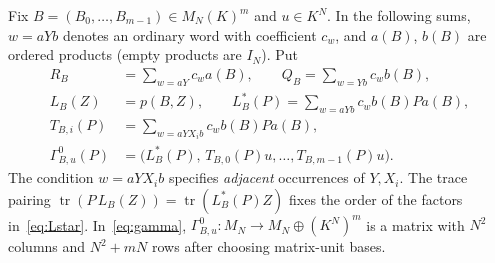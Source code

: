 \documentclass[11pt,reqno]{amsart}
\theoremstyle{definition}
\newcommand{\tr}{\operatorname{tr}}
\begin{document}
Fix $B=(B_0,\ldots,B_{m-1})\in M_N(K)^m$ and $u\in K^N$.  In the following sums, $w=aYb$ denotes an ordinary word with coefficient $c_w$, and $a(B)$, $b(B)$ are ordered products (empty products are $I_N$).  Put
\begin{align}
 R_B&=\sum_{w=aY}c_w a(B),\qquad
 Q_B=\sum_{w=Yb}c_w b(B),\label{eq:endpoints}\\
 L_B(Z)&=p(B,Z),\qquad
 L_B^*(P)=\sum_{w=aYb}c_w b(B)P a(B),\label{eq:Lstar}\\
 T_{B,i}(P)&=\sum_{w=aY X_i b}c_w b(B)P a(B),\label{eq:T-map}\\
 \Gamma^0_{B,u}(P)&=\bigl(L_B^*(P),\,T_{B,0}(P)u,\ldots,
 T_{B,m-1}(P)u\bigr).\label{eq:gamma}
\end{align}
The condition $w=aYX_i b$ specifies \emph{adjacent} occurrences of $Y,X_i$.  The trace pairing $\tr(P\,L_B(Z))=\tr(L_B^*(P)Z)$ fixes the order of the factors in~\eqref{eq:Lstar}.  In~\eqref{eq:gamma}, $\Gamma^0_{B,u}:M_N\to M_N\oplus(K^N)^m$ is a matrix with $N^2$ columns and $N^2+mN$ rows after choosing matrix-unit bases.
\end{document}
